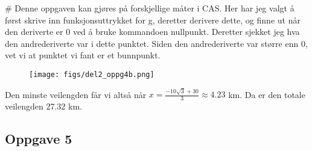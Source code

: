 \begin{easylist}[enumerate]
	
	# Denne oppgaven kan gjøres på forskjellige måter i CAS. Her har jeg valgt å først skrive inn funksjonsuttrykket for g, deretter derivere dette, og finne ut når den deriverte er $0$ ved å bruke kommandoen nullpunkt. Deretter sjekket jeg hva den andrederiverte var i dette punktet. Siden den andrederiverte var større enn $0$, vet vi at punktet vi fant er et bunnpunkt.
	
	
	\begin{figure}[ht!]
		\centering
		\texttt{[image: figs/del2\_oppg4b.png]}
	\end{figure}
	
	Den minste veilengden får vi altså når $x = \frac{-10 \sqrt{3} + 30}{3} \approx 4.23$ km. Da er den totale veilengden 27.32 km.
\end{easylist}

\subsection*{Oppgave 5}

